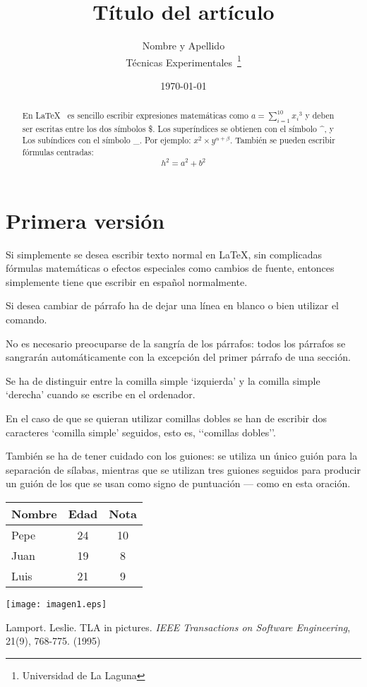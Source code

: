 \documentclass[a4paper,12pt]{article}
\begin{document}
\title{Título del artículo}
\author{Nombre y Apellido \\
        Técnicas Experimentales~\footnote{Universidad de La Laguna}
        }
\date{\today}
\maketitle
\begin{abstract}
  En \LaTeX{}~\cite{Lam:86} es sencillo escribir expresiones 
  matemáticas como $a=\sum_{i=1}^{10} {x_i}^{3}$
  y deben ser escritas entre los dos símbolos \$.
  Los superíndices se obtienen con el símbolo \^{}, y
  Los subíndices con el símbolo \_.
  Por ejemplo: $x^2 \times y^{\alpha + \beta}$.
  También se pueden escribir fórmulas centradas:
  \[h^2=a^2 + b^2 \]
\end{abstract}

\section{Primera versión}
Si simplemente se desea escribir texto normal en LaTeX,
sin complicadas f\'ormulas matem\'aticas o efectos especiales 
como cambios de fuente, entonces simplemente tiene que escribir 
en espa\~nol normalmente.\par


Si desea cambiar de p\'arrafo ha de dejar una l\'inea en blanco o bien
utilizar el comando. \par


No es necesario preocuparse de la sangr\'ia de los p\'arrafos:
todos los p\'arrafos se sangrar\'an autom\'aticamente con la excepci\'on
del primer p\'arrafo de una secci\'on.


Se ha de distinguir entre la comilla simple ‘izquierda’
y la comilla simple ‘derecha’ cuando se escribe en el ordenador.


En el caso de que se quieran utilizar comillas dobles se han de
escribir dos caracteres ‘comilla simple’ seguidos, esto es,
‘‘comillas dobles’’. 


Tambi\'en se ha de tener cuidado con los guiones: se utiliza un único
gui\'on para la separaci\'on de s\'ilabas, mientras que se utilizan
tres guiones seguidos para producir un gui\'on de los que se usan
como signo de puntuaci\'on --- como en esta oraci\'on. 

\bigskip
\begin{tabular}{|l|c|c|}
\hline
   Nombre & Edad  & Nota  \\ \hline
   Pepe   &   24  &   10  \\ \hline
   Juan   &   19  &    8  \\ \hline
   Luis   &   21  &    9  \\ \hline
\end{tabular}


\texttt{[image: imagen1.eps]}

\begin{thebibliography}{00}
  Lamport. Leslie.
  TLA in pictures.
  \emph{IEEE Transactions on Software Engineering},
  21(9), 768-775.
  (1995)
\end{thebibliography}
\end{document}
